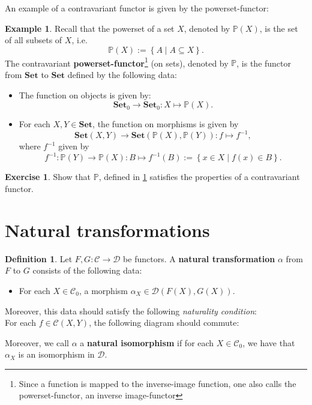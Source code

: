 \documentclass[a4paper,10pt]{scrartcl}
\theoremstyle{plain}
\theoremstyle{definition}
\newtheorem{dfn}[thm]{Definition}
\newtheorem{exa}[thm]{Example}
\newtheorem{exer}[thm]{Exercise}
\newcommand{\Cat}[1]{\mathcal{#1}}
\newcommand{\CC}{\Cat{C}}
\newcommand{\DD}{\Cat{D}}
\newcommand{\Catb}[1]{\mathbf{#1}}
\newcommand{\SET}{\Catb{Set}}
\newcommand{\Ob}[1]{{#1}_0}
\newcommand{\CHom}[3]{{#1}(#2,#3)}
\begin{document}
An example of a contravariant functor is given by the powerset-functor:
\begin{exa} \label{example:powersetfunctor} Recall that the powerset of a set $X$, denoted by $\mathbb{P}(X)$, is the set of all subsets of $X$, i.e. 
\[
\mathbb{P}(X) :=  \left\{A \mid A\subseteq X\right\}.
\]
The contravariant \textbf{powerset-functor}\footnote{Since a function is mapped to the inverse-image function, one also calls the powerset-functor, an inverse image-functor} (on sets), denoted by $\mathbb{P}$, is the functor from $\SET$ to $\SET$ defined by the following data:
\begin{itemize}
\item The function on objects is given by:
\[
\Ob{\SET}\to \Ob{\SET}: X\mapsto \mathbb{P}(X).
\]
\item For each $X,Y\in\SET$, the function on morphisms is given by
\[
\CHom{\SET}{X}{Y} \to \CHom{\SET}{\mathbb{P}(X)}{\mathbb{P}(Y)}: f\mapsto f^{-1},
\]
where $f^{-1}$ given by
\[
f^{-1}:\mathbb{P}(Y)\to \mathbb{P}(X): B\mapsto f^{-1}(B) := \left\{x\in X \mid f(x)\in B\right\}.
\]
\end{itemize}
\end{exa}

\begin{exer} Show that $\mathbb{P}$, defined in \cref{example:powersetfunctor} satisfies the properties of a contravariant functor.
\end{exer}


\section{Natural transformations}
\label{sec:nat-trans}

\begin{dfn} Let $F,G: \CC\to\DD$ be functors. A \textbf{natural transformation} $\alpha$ from $F$ to $G$ consists of the following data:
\begin{itemize}
\item For each $X\in \Ob{\CC}$, a morphism $\alpha_X \in \CHom{\DD}{F(X)}{G(X)}$.
\end{itemize}
Moreover, this data should satisfy the following \textit{naturality condition}:\\
For each $f\in \CHom{\CC}{X}{Y}$, the following diagram should commute:
\begin{center}
\end{center}
Moreover, we call $\alpha$ a \textbf{natural isomorphism} if for each $X\in\Ob{\CC}$, we have that $\alpha_X$ is an isomorphism in $\DD$.
\end{dfn}
\end{document}
